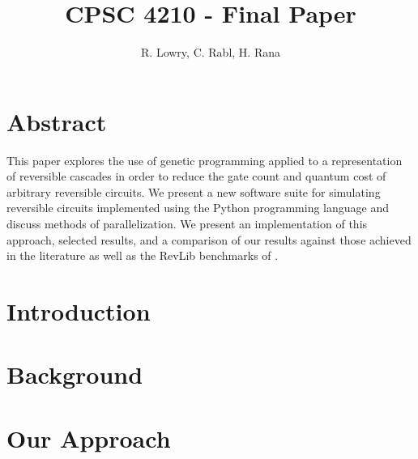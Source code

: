 \documentclass[12pt]{article}
\title{CPSC 4210 - Final Paper}
\author{R. Lowry, C. Rabl, H. Rana}
\date{}
\begin{document}
\maketitle

\section*{Abstract}


This paper explores the use of genetic programming applied to a representation of reversible cascades in order to reduce the gate count and quantum cost of arbitrary reversible circuits. We present a new software suite for simulating reversible circuits implemented using the Python programming language and discuss methods of parallelization. We present an implementation of this approach, selected results, and a comparison of our results against those achieved in the literature as well as the RevLib benchmarks of \cite{RevLib}.

\begingroup
\let\clearpage\relax
\section{Introduction}



\section{Background}










\section{Our Approach}







\endgroup

\pagebreak


\end{document}
